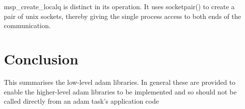 msp\_create\_localq is distinct in its operation. It uses socketpair() to
create a pair of unix sockets, thereby giving the single process access
to both ends of the communication.

\section {Conclusion}

This summarises the low-level adam libraries. In general these are
provided to enable the higher-level adam libraries to be implemented and
so should not be called directly from an adam task's application code


